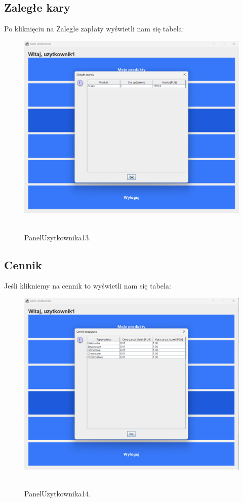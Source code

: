 \subsection{Zaległe kary}
\label{subsec:Zaległe kary}
Po kliknięciu na Zaległe zapłaty wyświetli nam się tabela:
\begin{figure}[H]
    \centering
    \includegraphics[width=.7\linewidth]{figures/PanelUzytkownika13.png}\
    \caption{PanelUzytkownika13.\label{PanelUzytkownika13}}
\end{figure}
\clearpage
\subsection{Cennik}
\label{subsec:Cennik}
Jeśli klikniemy na cennik to wyświetli nam się tabela:
\begin{figure}[H]
    \centering
    \includegraphics[width=.7\linewidth]{figures/PanelUzytkownika14.png}\
    \caption{PanelUzytkownika14.\label{PanelUzytkownika14}}
\end{figure}
\clearpage
